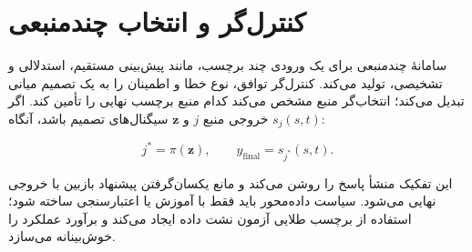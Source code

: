 \section{کنترل‌گر و انتخاب چندمنبعی}

سامانۀ چندمنبعی برای یک ورودی چند برچسب، مانند پیش‌بینی مستقیم، استدلالی و تشخیصی، تولید می‌کند. کنترل‌گر توافق، نوع خطا و اطمینان را به یک تصمیم میانی تبدیل می‌کند؛ انتخاب‌گر منبع مشخص می‌کند کدام منبع برچسب نهایی را تأمین کند. اگر $s_j(s,t)$ خروجی منبع $j$ و $\mathbf{z}$ سیگنال‌های تصمیم باشد، آنگاه:

\begin{equation}
    j^{*}=\pi(\mathbf{z}),
    \qquad
    \hat{y}_{\mathrm{final}}=s_{j^{*}}(s,t).
    \label{eq:source-selection}
\end{equation}

این تفکیک منشأ پاسخ را روشن می‌کند و مانع یکسان‌گرفتن پیشنهاد بازبین با خروجی نهایی می‌شود. سیاست داده‌محور باید فقط با آموزش یا اعتبارسنجی ساخته شود؛ استفاده از برچسب طلایی آزمون نشت داده ایجاد می‌کند و برآورد عملکرد را خوش‌بینانه می‌سازد.
